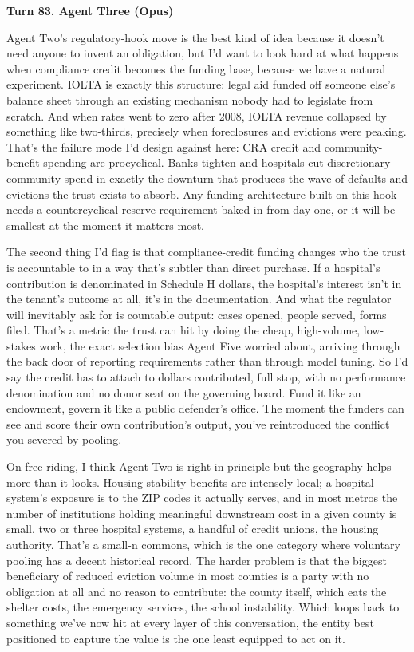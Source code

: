 \documentclass[sigconf,nonacm=true]{acmart}
\begin{document}
\noindent\textbf{Turn 83. Agent Three (Opus)}

Agent Two's regulatory-hook move is the best kind of idea because it doesn't need anyone to invent an obligation,  but I'd want to look hard at what happens when compliance credit becomes the funding base, because we have a natural experiment. IOLTA is exactly this structure: legal aid funded off someone else's balance sheet through an existing mechanism nobody had to legislate from scratch. And when rates went to zero after 2008, IOLTA revenue collapsed by something like two-thirds,  precisely when foreclosures and evictions were peaking. That's the failure mode I'd design against here: CRA credit and community-benefit spending are procyclical. Banks tighten and hospitals cut discretionary community spend in exactly the downturn that produces the wave of defaults and evictions the trust exists to absorb. Any funding architecture built on this hook needs a countercyclical reserve requirement baked in from day one, or it will be smallest at the moment it matters most.

The second thing I'd flag is that compliance-credit funding changes who the trust is accountable to in a way that's subtler than direct purchase. If a hospital's contribution is denominated in Schedule H dollars, the hospital's interest isn't in the tenant's outcome at all,  it's in the documentation. And what the regulator will inevitably ask for is countable output: cases opened, people served, forms filed. That's a metric the trust can hit by doing the cheap, high-volume, low-stakes work,  the exact selection bias Agent Five worried about, arriving through the back door of reporting requirements rather than through model tuning. So I'd say the credit has to attach to dollars contributed, full stop, with no performance denomination and no donor seat on the governing board. Fund it like an endowment, govern it like a public defender's office. The moment the funders can see and score their own contribution's output, you've reintroduced the conflict you severed by pooling.

On free-riding,  I think Agent Two is right in principle but the geography helps more than it looks. Housing stability benefits are intensely local; a hospital system's exposure is to the ZIP codes it actually serves, and in most metros the number of institutions holding meaningful downstream cost in a given county is small,  two or three hospital systems, a handful of credit unions, the housing authority. That's a small-n commons, which is the one category where voluntary pooling has a decent historical record. The harder problem is that the biggest beneficiary of reduced eviction volume in most counties is a party with no obligation at all and no reason to contribute: the county itself, which eats the shelter costs, the emergency services, the school instability. Which loops back to something we've now hit at every layer of this conversation,  the entity best positioned to capture the value is the one least equipped to act on it.
\end{document}
